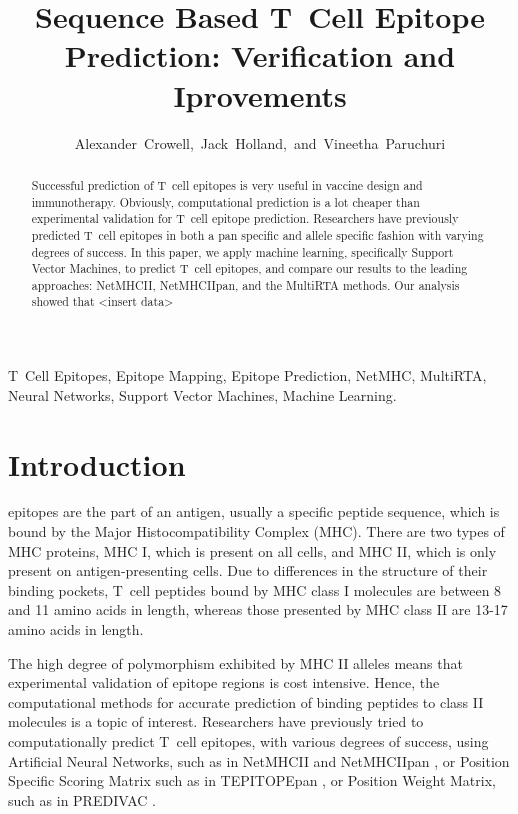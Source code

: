 \documentclass[journal]{IEEEtran}
\begin{document}
\title{Sequence Based T~Cell Epitope Prediction: Verification and Iprovements}

\author{Alexander~Crowell,~Jack~Holland,~and~Vineetha~Paruchuri}


\maketitle


\begin{abstract}
Successful prediction of T~cell epitopes is very useful in vaccine design and immunotherapy. Obviously, computational prediction is a lot cheaper than experimental validation for T~cell epitope prediction. Researchers have previously predicted T~cell epitopes in both a pan specific and allele specific fashion with varying degrees of success. In this paper, we apply machine learning, specifically Support Vector Machines, to predict T~cell epitopes, and compare our results to the leading approaches: NetMHCII, NetMHCIIpan, and the MultiRTA methods. Our analysis showed that <insert data> 
\end{abstract}


\begin{IEEEkeywords}
T~Cell Epitopes, Epitope Mapping, Epitope Prediction, NetMHC, MultiRTA, Neural Networks, Support Vector Machines, Machine Learning.
\end{IEEEkeywords}





\section{Introduction}

 epitopes are the part of an antigen, usually a specific peptide sequence, which is bound by the Major Histocompatibility Complex (MHC). There are two types of MHC proteins, MHC I, which is present on all cells, and MHC II, which is only present on antigen-presenting cells. Due to differences in the structure of their binding pockets, T~cell peptides bound by MHC class I molecules are between 8 and 11 amino acids in length, whereas those presented by MHC class II are 13-17 amino acids in length. 

The high degree of polymorphism exhibited by MHC II alleles means that experimental validation of epitope regions is cost intensive. Hence, the computational methods for accurate prediction of binding peptides to class II molecules is a topic of interest. Researchers have previously tried to computationally predict T~cell epitopes, with various degrees of success, using Artificial Neural Networks, such as in NetMHCII \cite{NetMHCII} and NetMHCIIpan \cite{NetMHCIIpan}, or Position Specific Scoring Matrix such as in TEPITOPEpan \cite{TEPITOPEpan}, or Position Weight Matrix, such as in PREDIVAC \cite{PREDIVAC}. 
\end{document}
